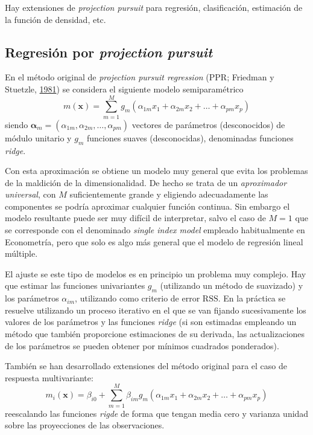 \documentclass[
  spanish,
]{book}
\theoremstyle{break}
\theoremstyle{definition}
\theoremstyle{definition}
\theoremstyle{definition}
\theoremstyle{remark}
\begin{document}
Hay extensiones de \emph{projection pursuit} para regresión, clasificación, estimación de la función de densidad, etc.

\hypertarget{ppr}{%
\subsection{\texorpdfstring{Regresión por \emph{projection pursuit}}{Regresión por projection pursuit}}\label{ppr}}

En el método original de \emph{projection pursuit regression} (PPR; Friedman y Stuetzle, \protect\hyperlink{ref-friedman1981projection}{1981}) se considera el siguiente modelo semiparamétrico
\[m(\mathbf{x}) = \sum_{m=1}^M g_m (\alpha_{1m}x_1 + \alpha_{2m}x_2 + \ldots + \alpha_{pm}x_p)\]
siendo \(\boldsymbol{\alpha}_m = (\alpha_{1m}, \alpha_{2m}, \ldots, \alpha_{pm})\) vectores de parámetros (desconocidos) de módulo unitario y \(g_m\) funciones suaves (desconocidas), denominadas funciones \emph{ridge}.

Con esta aproximación se obtiene un modelo muy general que evita los problemas de la maldición de la dimensionalidad.
De hecho se trata de un \emph{aproximador universal}, con \(M\) suficientemente grande y eligiendo adecuadamente las componentes se podría aproximar cualquier función continua.
Sin embargo el modelo resultante puede ser muy difícil de interpretar, salvo el caso de \(M=1\) que se corresponde con el denominado \emph{single index model} empleado habitualmente en Econometría, pero que solo es algo más general que el modelo de regresión lineal múltiple.

El ajuste se este tipo de modelos es en principio un problema muy complejo.
Hay que estimar las funciones univariantes \(g_m\) (utilizando un método de suavizado) y los parámetros \(\alpha_{im}\), utilizando como criterio de error \(\mbox{RSS}\).
En la práctica se resuelve utilizando un proceso iterativo en el que se van fijando sucesivamente los valores de los parámetros y las funciones \emph{ridge} (si son estimadas empleando un método que también proporcione estimaciones de su derivada, las actualizaciones de los parámetros se pueden obtener por mínimos cuadrados ponderados).

También se han desarrollado extensiones del método original para el caso de respuesta multivariante:
\[m_i(\mathbf{x}) = \beta_{i0} + \sum_{m=1}^M \beta_{im} g_m (\alpha_{1m}x_1 + \alpha_{2m}x_2 + \ldots + \alpha_{pm}x_p)\]
reescalando las funciones \emph{rigde} de forma que tengan media cero y varianza unidad sobre las proyecciones de las observaciones.
\end{document}
